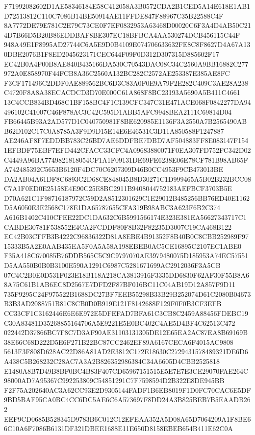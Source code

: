 \documentclass[UTF8,fontset=fandol,zihao=-4,a4paper]{ctexart}
\begin{document}
{{F71992082602D1AE58346184E58C412058A3B0572CDA2B1CED5A14E618E1AB1D72513812C110C7086B14BE50914AE11FFDE847F88967C35B22588C4F
8A7772DE79E781C2E79C73CE0F7EF0832953A63468D00020C6F3A4D4AB50C214D7B66D5B20B86EDDBAF8BE307EC18BFBCA4AA530274DCB456115C44F
948A49E1F8995AD27744C6A5E9D0B4109E074706633632FE8C8F8627D4A67A130DBE2076B1F8ED2045623171CEC644F09F0D312D307315D885602F17
EC42B0A4F00B8AE840B435166DA530C70543DAC08C34C2560A9BB16882C277972A0E858970F44FCB8A36C2560A132BC282C2572AE253387E385AE8FC
F3CF171496C2DDF0AE889562BC6D3C83A0F0E9A79F2E282C409C3AE28A238C4720F8A8A38ECACDCD3D70E000C61A868F8BC23193A5690A5B411C4661
13C4CCB834BD468C1BF158BC4F1C139CFC347C31E471ACE068F0842277DA94496102C41007C46F878AC3C42C595D1ABB5AFC9948BEA2111C69814D04
FB66445B93A2AD577D1C040750981F8BE620985E1136F3A2550A7B2565490ABB62D102C17C0A8785A3F9D9D15E14E6E46531C3D11A850588F1247887
AE246AF8F7EDDBB783C26BD7AE6DDFBE7DBD7AF504883FF8E083147F1541EFBDF75EBF7EFD442CFACC33CFC4A09683880071F0EA307FD752FC342D02
C4449A96BA7749821818054CF1A1F09131DE69FE6238E06E78CF781B98AB65FA742485392C5653B6120F4DC70C6207309D46B0CC4953F9CB473013BE
DA2AB04A61DF8C6893C2D68CE848045B8D30271C1D999465A5B02B232BCC08C7A1F0ED0E25158E4E90C25E8BC2911B9408044752183AEFBCF3703B5E
D70A621C1F98716187972C59D2A8512301629C1E29012B485256BB76ED40E1162D5A6050E3E2568C178E1DA65787655CFA319B98ABC3A623F6B2C374
A616B1402C410CFEE22DC1DA632C6B5991566174E323E381EA56627343717C1CABDE30781F538552E4CA2FCDDF80F8B32F82235D3007C19CA468B122
EC42B03CFFB3B4222C96836322D81A8EBE4B91352F8B40B0C8CBB252989F9715333B5A2E0AAB435EA5F0A5A58A198EBEB0AC5CE16895C2107EC1ABE0
F35A418C670085B76DDB565C5C9C9797070AE3979480075D185953A74EC57551D5AA550B0B0B3100E590A1291C6987C5281671699AC2912036F3A5CB
07C4C2B0E0D531F023E18B118A218CA3813916F3335DD6830F62AF30F55B8A68A75C61B1AB6EC8D2567E7DFD2F87BF016BC11C04AB19D12A857F9D11
735F9295C24F975522B1688DC27BF7EEB55298B33B29B252074D61C2080B04673B3B3AD2088751B81C8CB0D0B919E121F8142688F129F0F0B3CF3EFB
CC33CF1C3162446E6E6E972E5DFEFAD7BFA61C3CB8C2459A88456FDEBC19C30A83481D35268855164706A5E9221E5E0BC402C4AE5D4BF4C62513C472
022442D37866BC7F8C7D3AF90AE31103131305DE12E65EA2AC87EA8B69169B38E66C68D222D5E6F271B22BC87CC2462EF89A6167CECA6F4015AC9808
5613F3F808D628AC22D86A81AD2E3812C172E18630C2729431578489321DE6D6A438C5B268232C28AC7A3A2B826352986384C34A6605D4CBB2525818
E1480A8B7D49B8BF0BC4B83F407CD65967151515E5E7E7E3CE29070FAE264C98000AD7A95367C992253809C54851291C7F7598594D2B322E8DE945BB
F2F75A202640AC3A62CC93E2D9305144FADF1B6EB8019F1D0FC70CAC6E5DF9BD5BAF95CA0BC4CC6DC5AE6C6A573697F8DD24A3B825BEB7B5EAADB262
EEF9CD0685B528345D9783B6C012C12EFEAA352A5D08A65D7064209A1F8BE66C10A6F7086B6131DF321DBEE1688E11E650D8158EBEB654B411E62C0A
}}
\end{document}
